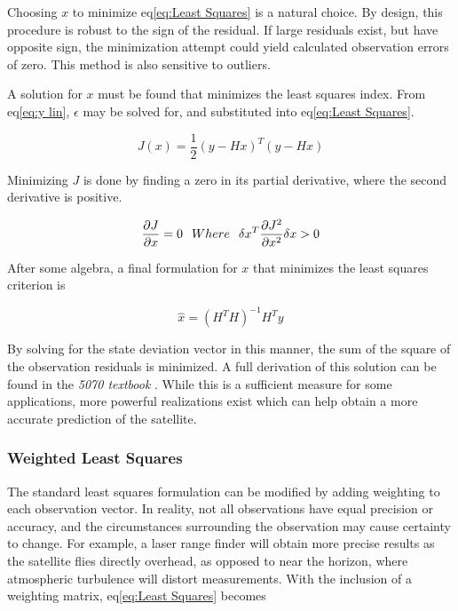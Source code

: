 \documentclass[12pt,a4paper,oneside]{article}
\numberwithin{equation}{section}   		%
\begin{document}
Choosing $x$ to minimize eq\eqref{eq:Least Squares} is a natural choice. By design, this procedure is robust to the sign of the residual. If large residuals exist, but have opposite sign, the minimization attempt could yield calculated observation errors of zero. This method is also sensitive to outliers.

A solution for $x$ must be found that minimizes the least squares index. From eq\eqref{eq:y lin}, $\epsilon$ may be solved for, and substituted into eq\eqref{eq:Least Squares}. 

\begin{equation}
	J(x) = \frac{1}{2}(y-Hx)^T (y-Hx)
	\label{eq:Min Least Squares}
\end{equation}

Minimizing $J$ is done by finding a zero in its partial derivative, where the second derivative is positive. 

\begin{displaymath}
	\frac{\partial{J}}{\partial{x}} = 0 
	\hspace{0.25cm} Where \hspace{0.25cm}
	\delta{x}^T\frac{\partial{J}^2}{\partial{x}^2} \delta{x}> 0 
\end{displaymath}

After some algebra, a final formulation for $x$ that minimizes the least squares criterion is

\begin{equation}
	\hat{x} = (H^T H)^{-1} H^T y
	\label{eq:x Least Squares}
\end{equation}

By solving for the state deviation vector in this manner, the sum of the square of the observation residuals is minimized. A full derivation of this solution can be found in the \emph{5070 textbook} \cite{tapley2004statistical}. While this is a sufficient measure for some applications, more powerful realizations exist which can help obtain a more accurate prediction of the satellite. 


\subsubsection{Weighted Least Squares}
\label{OD sub WLS}
The standard least squares formulation can be modified by adding weighting to each observation vector. In reality, not all observations have equal precision or accuracy, and the circumstances surrounding the observation may cause certainty to change. For example, a laser range finder will obtain more precise results as the satellite flies directly overhead, as opposed to near the horizon, where atmospheric turbulence will distort measurements. With the inclusion of a weighting matrix, eq\eqref{eq:Least Squares} becomes
\end{document}
